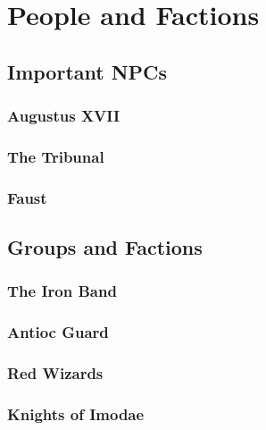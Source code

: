 \section{People and Factions}
	
	\subsection{Important NPCs}

		\subsubsection{Augustus XVII}

		\subsubsection{The Tribunal}

		\subsubsection{Faust}

	\subsection{Groups and Factions}

		\subsubsection{The Iron Band}

		\subsubsection{Antioc Guard}

		\subsubsection{Red Wizards}
	
		\subsubsection{Knights of Imodae}

